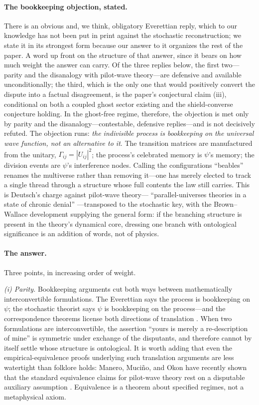 \documentclass[11pt]{article}
\theoremstyle{remark}
\begin{document}
\paragraph{The bookkeeping objection, stated.}
There is an obvious and, we think, obligatory Everettian reply, which
to our knowledge has not been put in print against the stochastic
reconstruction; we state it in its strongest form because our answer
to it organizes the rest of the paper. A word up front on the
structure of that answer, since it bears on how much weight the answer
can carry. Of the three replies below, the first two---parity and the
disanalogy with pilot-wave theory---are defensive and available
unconditionally; the third, which is the only one that would
positively convert the dispute into a factual disagreement, is the
paper's conjectural claim (iii), conditional on both a coupled ghost
sector existing and the shield-converse conjecture holding. In the
ghost-free regime, therefore, the objection is met only by parity and
the disanalogy---contestable, defensive replies---and is not decisively
refuted. The objection runs: \emph{the
indivisible process is bookkeeping on the universal wave function, not
an alternative to it}. The transition matrices are manufactured from
the unitary, $\Gamma_{ij}=|U_{ij}|^{2}$; the process's celebrated
memory is $\psi$'s memory; the division events are $\psi$'s
interference nodes. Calling the configurations ``beables'' renames the
multiverse rather than removing it---one has merely elected to track a
single thread through a structure whose full contents the law still
carries. This is Deutsch's charge against pilot-wave theory---%
``parallel-universes theories in a state of chronic denial''
\cite{Deutsch1996}---transposed to the stochastic key, with the
Brown--Wallace development \cite{BrownWallace} supplying the general
form: if the branching structure is present in the theory's dynamical
core, dressing one branch with ontological significance is an
addition of words, not of physics.

\paragraph{The answer.} Three points, in increasing order of weight.

\emph{(i) Parity.} Bookkeeping arguments cut both ways between
mathematically interconvertible formulations. The Everettian says the
process is bookkeeping on $\psi$; the stochastic theorist says
$\psi$ is bookkeeping on the process---and the correspondence
theorems license both directions of translation
\cite{BarandesTheorem}. When two formulations are interconvertible,
the assertion ``yours is merely a re-description of mine'' is
symmetric under exchange of the disputants, and therefore cannot by
itself settle whose structure is ontological. It is worth adding that
even the empirical-equivalence proofs underlying such translation
arguments are less watertight than folklore holds: Manero, Muci\~no,
and Okon have recently shown that the standard equivalence claims for
pilot-wave theory rest on a disputable auxiliary assumption
\cite{MMO2025}. Equivalence is a theorem about specified regimes, not
a metaphysical axiom.
\end{document}
